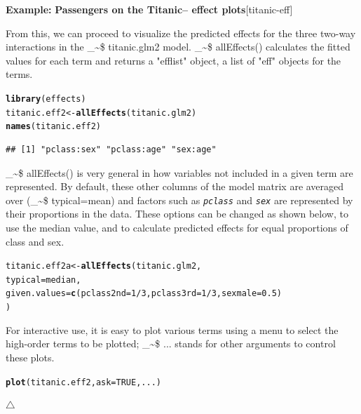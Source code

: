\documentclass{article}
\makeatletter
\newcommand{\hlnum}[1]{\textcolor[rgb]{0.686,0.059,0.569}{#1}}%
\newcommand{\hlopt}[1]{\textcolor[rgb]{0,0,0}{#1}}%
\newcommand{\hlstd}[1]{\textcolor[rgb]{0.345,0.345,0.345}{#1}}%
\newcommand{\hlkwb}[1]{\textcolor[rgb]{0.69,0.353,0.396}{#1}}%
\newcommand{\hlkwc}[1]{\textcolor[rgb]{0.333,0.667,0.333}{#1}}%
\newcommand{\hlkwd}[1]{\textcolor[rgb]{0.737,0.353,0.396}{\textbf{#1}}}%
\newenvironment{kframe}{%
 \def\at@end@of@kframe{}%
 \ifinner\ifhmode%
  \def\at@end@of@kframe{\end{minipage}}%
  \begin{minipage}{\columnwidth}%
 \fi\fi%
 \def\FrameCommand##1{\hskip\@totalleftmargin \hskip-\fboxsep
 \colorbox{shadecolor}{##1}\hskip-\fboxsep
     \hskip-\linewidth \hskip-\@totalleftmargin \hskip\columnwidth}%
 \MakeFramed {\advance\hsize-\width
   \@totalleftmargin\z@ \linewidth\hsize
   \@setminipage}}%
 {\par\unskip\endMakeFramed%
 \at@end@of@kframe}
\newenvironment{knitrout}{}{} %
\newcommand{\var}[1]{\textit{\texttt{#1}}}
\newcommand{\class}[1]{\textsf{"#1"}}
\newcommand\code{\bgroup\@makeother\_\@makeother\~\@makeother\$\@codex}
\def\@codex#1{{\normalfont\ttfamily\hyphenchar\font=-1 #1}\egroup}
\newcommand{\func}[1]{\code{#1()}}
\newenvironment{Example}[2][unnamed-example]%
  {\medskip\noindent\textbf{\textsf{Example:}}
   \textbf{#2}\hfill [#1]\par\smallskip
  }
  {\hfill $\triangle$}
\makeatother
\begin{document}
\begin{Example}[titanic-eff]{Passengers on the Titanic-- effect plots}
From this, we can proceed to visualize the predicted effects for the three two-way interactions 
in the \code{titanic.glm2} model.  \func{allEffects} calculates the fitted values for each
term and returns a \class{efflist} object, a list of \class{eff} objects for the terms.
\begin{knitrout}
\color{fgcolor}\begin{kframe}
\begin{alltt}
\hlkwd{library}\hlstd{(effects)}
\hlstd{titanic.eff2} \hlkwb{<-} \hlkwd{allEffects}\hlstd{(titanic.glm2)}
\hlkwd{names}\hlstd{(titanic.eff2)}
\end{alltt}
\begin{verbatim}
## [1] "pclass:sex" "pclass:age" "sex:age"
\end{verbatim}
\end{kframe}
\end{knitrout}

\func{allEffects} is very general in how variables not included in a given term
are represented.  By default, these other columns of the model matrix
are averaged over (\code{typical=mean}) and factors such as \var{pclass} and
\var{sex} are represented by their proportions in the data.  These options
can be changed as shown below, to use the median value, and to calculate predicted
effects for equal proportions of class and sex.

\begin{knitrout}
\color{fgcolor}\begin{kframe}
\begin{alltt}
\hlstd{titanic.eff2a} \hlkwb{<-} \hlkwd{allEffects}\hlstd{(titanic.glm2,}
  \hlkwc{typical}\hlstd{=median,}
  \hlkwc{given.values}\hlstd{=}\hlkwd{c}\hlstd{(}\hlkwc{pclass2nd}\hlstd{=}\hlnum{1}\hlopt{/}\hlnum{3}\hlstd{,} \hlkwc{pclass3rd}\hlstd{=}\hlnum{1}\hlopt{/}\hlnum{3}\hlstd{,} \hlkwc{sexmale}\hlstd{=}\hlnum{0.5}\hlstd{)}
        \hlstd{)}
\end{alltt}
\end{kframe}
\end{knitrout}


For interactive use, it is easy to plot various terms using a menu to select
the high-order terms to be plotted; \code{...} stands for other arguments
to control these plots.
\begin{knitrout}
\color{fgcolor}\begin{kframe}
\begin{alltt}
\hlkwd{plot}\hlstd{(titanic.eff2,} \hlkwc{ask}\hlstd{=}\hlnum{TRUE}\hlstd{, ...)}
\end{alltt}
\end{kframe}
\end{knitrout}


\end{Example}
\end{document}
